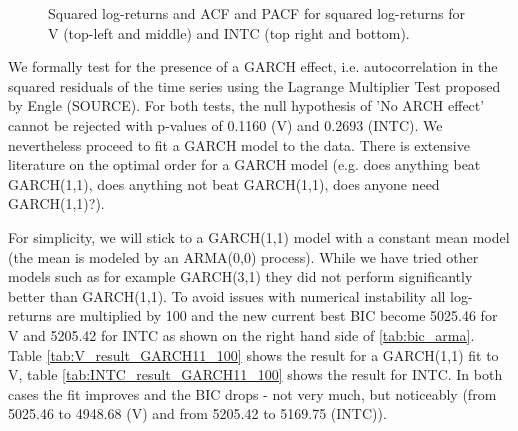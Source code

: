 \begin{figure}[h]
    \centering
    \begin{adjustbox}{width=.95\textwidth,center}
    
    
    \end{adjustbox}
    \hspace{3ex}
    \begin{adjustbox}{width=.95\textwidth,center}
    
    \end{adjustbox}
    \begin{adjustbox}{width=.95\textwidth,center}
    
    \end{adjustbox}
    \caption{Squared log-returns and ACF and PACF for squared log-returns for V (top-left and middle) and INTC (top right and bottom). }
    \label{fig:V_INTC_squared}
\end{figure}{}

We formally test for the presence of a GARCH effect, i.e. autocorrelation in the squared residuals of the time series using the Lagrange Multiplier Test proposed by Engle (SOURCE). For both tests, the null hypothesis of 'No ARCH effect' cannot be rejected with p-values of 0.1160 (V) and 0.2693 (INTC). We nevertheless proceed to fit a GARCH model to the data. There is extensive literature on the optimal order for a GARCH model (e.g. does anything beat GARCH(1,1), does anything not beat GARCH(1,1), does anyone need GARCH(1,1)?). 

For simplicity, we will stick to a GARCH(1,1) model with a constant mean model (the mean is modeled by an ARMA(0,0) process). While we have tried other models such as for example GARCH(3,1) they did not perform significantly better than GARCH(1,1). To avoid issues with numerical instability all log-returns are multiplied by 100 and the new current best BIC become 5025.46 for V and 5205.42 for INTC as shown on the right hand side of \ref{tab:bic_arma}. Table \ref{tab:V_result_GARCH11_100} shows the result for a GARCH(1,1) fit to V, table \ref{tab:INTC_result_GARCH11_100} shows the result for INTC. In both cases the fit improves and the BIC drops - not very much, but noticeably (from 5025.46 to 4948.68 (V) and from 5205.42 to 5169.75 (INTC)). 

\begin{table}[h]
    \centering
    
    \caption{}
    \label{tab:V_result_GARCH11_100}
\end{table}{}

